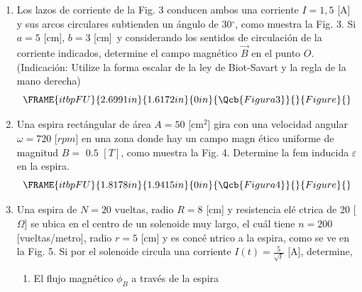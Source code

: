 \documentclass[onecolumn]{article}
\begin{document}
\begin{enumerate}
\item Los lazos de corriente de la Fig. 3 conducen ambos una corriente $I=1,5
$ [A] y sus arcos circulares subtienden un \'{a}ngulo de 30$%
{{}^\circ}%
$, como muestra la Fig. 3. Si $a=5$ [cm], $b=3$ [cm]\thinspace\ y
considerando los sentidos de circulaci\'{o}n de la corriente indicados,
determine el campo magn\'{e}tico $\vec{B}$ en el punto $O.$ (Indicaci\'{o}n:
Utilize la forma escalar de la ley de Biot-Savart y la regla de la mano
derecha)%
\begin{equation*}
\FRAME{itbpFU}{2.6991in}{1.6172in}{0in}{\Qcb{Figura 3}}{}{Figure}{\special%
{language "Scientific Word";type "GRAPHIC";maintain-aspect-ratio
TRUE;display "USEDEF";valid_file "T";width 2.6991in;height 1.6172in;depth
0in;original-width 6.5726in;original-height 3.9271in;cropleft "0";croptop
"1";cropright "1";cropbottom "0";tempfilename
'THI8LU03.bmp';tempfile-properties "XPR";}}
\end{equation*}

\item Una espira rect\'{a}ngular de \'{a}rea $A=50$ [cm$^{2}$] gira con una
velocidad angular $\omega =720$ [$rpm$] en una zona donde hay un campo magn%
\'{e}tico uniforme de magnitud $B=$ $0.5$ $[T]$, como muestra la Fig. 4.
Determine la fem inducida $\varepsilon $ en la espira.%
\begin{equation*}
\FRAME{itbpFU}{1.8178in}{1.9415in}{0in}{\Qcb{Figura 4}}{}{Figure}{\special%
{language "Scientific Word";type "GRAPHIC";maintain-aspect-ratio
TRUE;display "USEDEF";valid_file "T";width 1.8178in;height 1.9415in;depth
0in;original-width 5.6464in;original-height 6.0364in;cropleft "0";croptop
"1";cropright "1";cropbottom "0";tempfilename
'THI95804.bmp';tempfile-properties "XPR";}}
\end{equation*}

\item Una espira de $N=20$ vueltas, radio $R=8$ [cm] y resistencia el\'{e}%
ctrica de 20 [$\Omega $] se ubica en el centro de un solenoide muy largo, el
cu\'{a}l tiene $n=200$ [vueltas/metro], radio $r=5$ [cm] y es conc\'{e}%
ntrico a la espira, como se ve en la Fig. 5. Si por el solenoide circula una
corriente $I(t)=\frac{5}{\sqrt{t}}$ [A], determine,

\begin{enumerate}
\item El flujo magn\'{e}tico $\phi _{B}$ a trav\'{e}s de la espira


\end{enumerate}
\end{enumerate}
\end{document}
